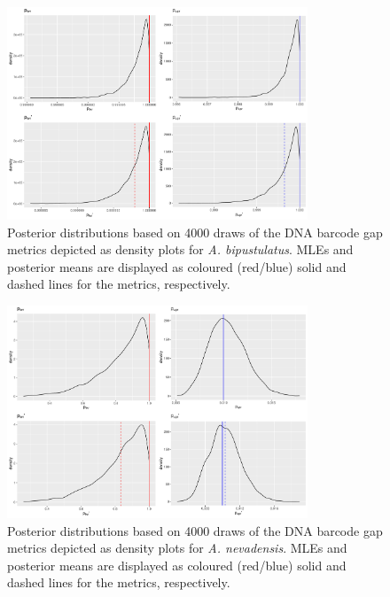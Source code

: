 \documentclass[12pt]{article}
\begin{document}
\newpage


\begin{figure}[H]

\centering

\includegraphics[width=0.80\textwidth]{Figure 5}

\caption{Posterior distributions based on 4000 draws of the DNA barcode gap metrics depicted as density plots for \textit{A. bipustulatus}. MLEs and posterior means are displayed as coloured (red/blue) solid and dashed lines for the metrics, respectively.}

\end{figure}

\newpage


\begin{figure}[H]

\centering

\includegraphics[width=0.80\textwidth]{Figure 6}

\caption{Posterior distributions based on 4000 draws of the DNA barcode gap metrics depicted as density plots for \textit{A. nevadensis}. MLEs and posterior means are displayed as coloured (red/blue) solid and dashed lines for the metrics, respectively.}

\end{figure}
\end{document}

